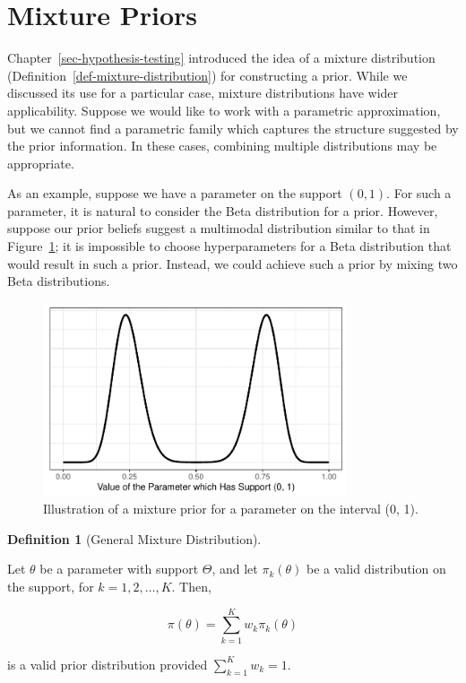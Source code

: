 \documentclass[
  letterpaper,
  DIV=11,
  numbers=noendperiod]{scrreprt}
\theoremstyle{definition}
\theoremstyle{definition}
\newtheorem{definition}{Definition}[chapter]
\theoremstyle{plain}
\theoremstyle{remark}
\begin{document}
\hypertarget{mixture-priors}{%
\section{Mixture Priors}\label{mixture-priors}}

Chapter~\ref{sec-hypothesis-testing} introduced the idea of a mixture
distribution (Definition~\ref{def-mixture-distribution}) for
constructing a prior. While we discussed its use for a particular case,
mixture distributions have wider applicability. Suppose we would like to
work with a parametric approximation, but we cannot find a parametric
family which captures the structure suggested by the prior information.
In these cases, combining multiple distributions may be appropriate.

As an example, suppose we have a parameter on the support \((0, 1)\).
For such a parameter, it is natural to consider the Beta distribution
for a prior. However, suppose our prior beliefs suggest a multimodal
distribution similar to that in Figure~\ref{fig-mixture-prior}; it is
impossible to choose hyperparameters for a Beta distribution that would
result in such a prior. Instead, we could achieve such a prior by mixing
two Beta distributions.

\begin{figure}

{\centering \includegraphics[width=0.8\textwidth,height=\textheight]{./images/fig-mixture-prior-1.pdf}

}

\caption{\label{fig-mixture-prior}Illustration of a mixture prior for a
parameter on the interval (0, 1).}

\end{figure}

\begin{definition}[General Mixture
Distribution]\protect\hypertarget{def-general-mixture-distribution}{}\label{def-general-mixture-distribution}

Let \(\theta\) be a parameter with support \(\Theta\), and let
\(\pi_k(\theta)\) be a valid distribution on the support, for
\(k = 1, 2, \dotsc, K\). Then,

\[\pi(\theta) = \sum_{k=1}^{K} w_k \pi_k(\theta)\]

is a valid prior distribution provided \(\sum_{k=1}^{K} w_k = 1\).

\end{definition}
\end{document}
